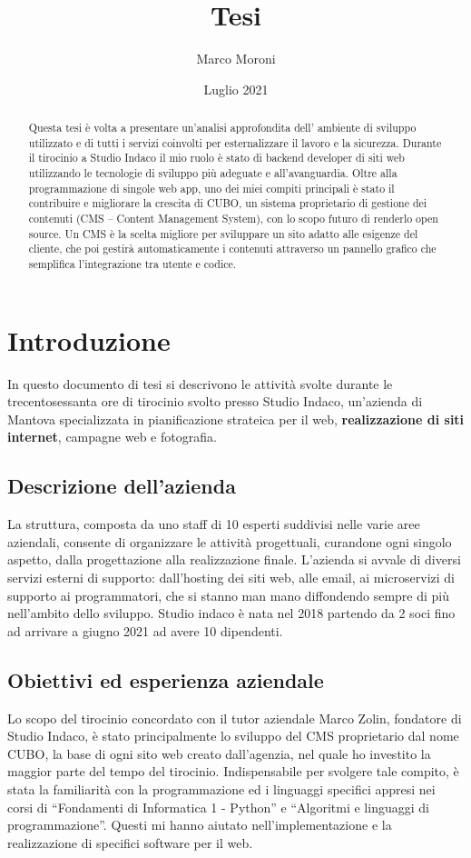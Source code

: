 \documentclass[12pt,a4paper]{article}
\title{Tesi}
\author{Marco Moroni }
\date{Luglio 2021}
\begin{document}
\maketitle
\clearpage
\clearpage
\begin{abstract}
\normalsize
Questa tesi è volta a presentare un’analisi approfondita dell' ambiente di sviluppo utilizzato e di tutti i servizi coinvolti per esternalizzare il lavoro e la sicurezza.
Durante il tirocinio a Studio Indaco il mio ruolo è stato di backend developer di siti web utilizzando le tecnologie di sviluppo più adeguate e all’avanguardia.
Oltre alla programmazione di singole web app, uno dei miei compiti principali è stato il contribuire e migliorare la crescita di CUBO, un sistema proprietario di gestione dei contenuti (CMS – Content Management System), con lo scopo futuro di renderlo open source. Un CMS è la scelta migliore per sviluppare un sito adatto alle esigenze del cliente, che poi gestirà automaticamente i contenuti attraverso un pannello grafico che semplifica l'integrazione tra utente e codice.

\end{abstract}
\clearpage
\tableofcontents{}
\clearpage

\section{Introduzione}
In questo documento di tesi si descrivono le attività svolte durante le trecentosessanta ore di tirocinio svolto presso Studio Indaco, un'azienda di Mantova specializzata in pianificazione strateica per il web, \textbf{realizzazione di siti internet}, campagne web e fotografia.
\subsection{Descrizione dell'azienda}
La struttura, composta da uno staff di 10 esperti suddivisi nelle varie aree aziendali, consente di organizzare le attività progettuali, curandone ogni singolo aspetto, dalla progettazione alla realizzazione finale.
L’azienda si avvale di diversi servizi esterni di supporto: dall’hosting dei siti web, alle email, ai microservizi di supporto ai programmatori, che si stanno man mano diffondendo sempre di più nell’ambito dello sviluppo.
Studio indaco è nata nel 2018 partendo da 2 soci fino ad arrivare a giugno 2021 ad avere 10 dipendenti.

\subsection{Obiettivi ed esperienza aziendale}
Lo scopo del tirocinio concordato con il tutor aziendale Marco Zolin, fondatore di Studio Indaco, è stato principalmente lo sviluppo del CMS proprietario dal nome CUBO, la base di ogni sito web creato dall’agenzia, nel  quale ho investito la maggior parte del tempo del tirocinio.
Indispensabile per svolgere tale compito, è stata la familiarità con la programmazione ed i linguaggi specifici appresi nei corsi di “Fondamenti di Informatica 1 - Python” e “Algoritmi e linguaggi di programmazione”. Questi mi hanno aiutato nell’implementazione e la realizzazione di specifici software per il web.
\end{document}
